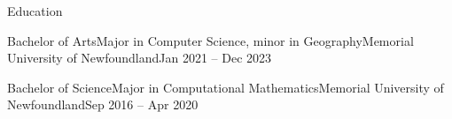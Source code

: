 \documentclass[]{Keenan-Nicholson-Resume}
\begin{document}
\resumeheader
{}
{}
{}
{}
{}

\begin{section}{Education}
    \begin{subsection}{Bachelor of Arts}{Major in Computer Science, minor in Geography}{Memorial University of Newfoundland}{Jan 2021 -- Dec 2023}
    \end{subsection}
    \begin{subsection}{Bachelor of Science}{Major in Computational Mathematics}{Memorial University of Newfoundland}{Sep 2016 -- Apr 2020}
    \end{subsection}
\end{section}
\end{document}
